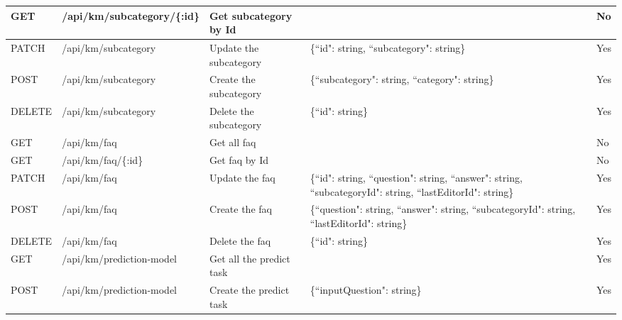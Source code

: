 \documentclass[12pt,oneside,openright,a4paper]{cpe-english-project}
\begin{document}
\begin{table}[h]
\begin{adjustbox}{width=\textwidth}
\begin{tabular}{|l|l|l|l|l|}
		GET		& /api/km/subcategory/\{:id\} & Get subcategory by Id 	& 												& No \\ \hline
		PATCH	& /api/km/subcategory 		& Update the subcategory 	& \{``id": string, ``subcategory": string\}			& Yes \\ \hline
		POST	& /api/km/subcategory 		& Create the subcategory 	& \{``subcategory": string, ``category": string\} 	& Yes \\ \hline
		DELETE	& /api/km/subcategory 		& Delete the subcategory 	& \{``id": string\} 								& Yes \\ \hline
		GET		& /api/km/faq 				& Get all faq 				& 												& No \\ \hline
		GET		& /api/km/faq/\{:id\} 		& Get faq by Id 			& 												& No \\ \hline
		PATCH	& /api/km/faq 				& Update the faq 			& \{``id": string, ``question": string, ``answer": string, ``subcategoryId": string, ``lastEditorId": string\}			 & Yes \\ \hline
		POST	& /api/km/faq 				& Create the faq 			& \{``question": string, ``answer": string, ``subcategoryId": string, ``lastEditorId": string\}	& Yes \\ \hline
		DELETE	& /api/km/faq 				& Delete the faq 			& \{``id": string\} 								& Yes \\ \hline
		GET		& /api/km/prediction-model 	& Get all the predict task 	& 												& Yes \\ \hline
		POST	& /api/km/prediction-model 	& Create the predict task 	& \{``inputQuestion": string\}						& Yes \\ \hline
		\end{tabular}
	\end{adjustbox}
\end{table}


\end{document}
